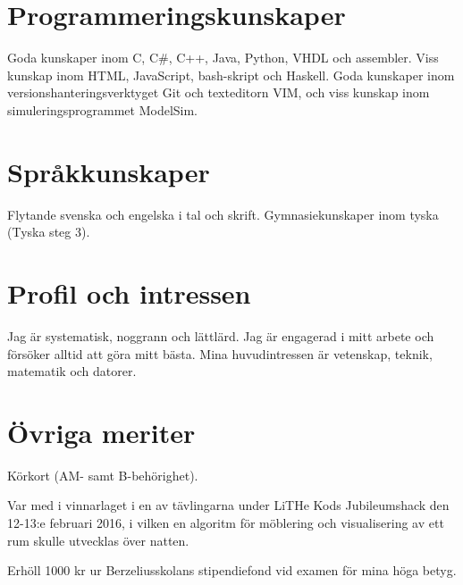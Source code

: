 \documentclass[a4paper,notitlepage]{article}
\begin{document}
\section*{Programmeringskunskaper}
Goda kunskaper inom C, C\#, C++, Java, Python, VHDL och assembler. Viss kunskap inom HTML,
JavaScript, bash-skript och Haskell. Goda kunskaper inom versionshanteringsverktyget Git
och texteditorn VIM, och viss kunskap inom simuleringsprogrammet ModelSim.
\section*{Språkkunskaper}
Flytande svenska och engelska i tal och skrift. Gymnasiekunskaper inom tyska
(Tyska steg 3).
\section*{Profil och intressen}
Jag är systematisk, noggrann och lättlärd. Jag är engagerad i mitt arbete och
försöker alltid att göra mitt bästa. Mina huvudintressen är vetenskap, teknik, matematik och datorer.

\section*{Övriga meriter}
Körkort (AM- samt B-behörighet).

Var med i vinnarlaget i en av tävlingarna under LiTHe Kods Jubileumshack den
12-13:e februari 2016, i vilken en algoritm för möblering och visualisering av 
ett rum skulle utvecklas över natten.

Erhöll 1000 kr ur Berzeliusskolans stipendiefond vid examen för mina höga
betyg.
\end{document}
